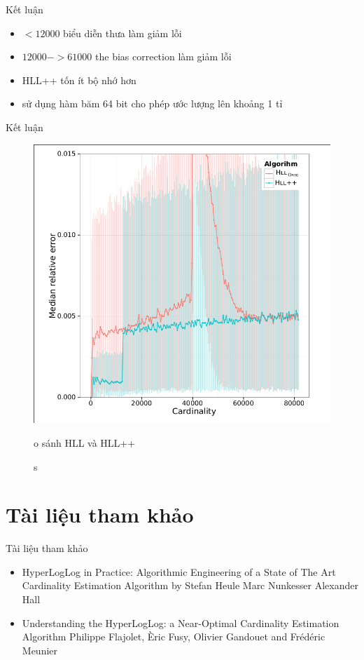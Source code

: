 \documentclass{beamer}
\newcommand{\bi}{\begin{itemize}}
\newcommand{\ei}{\end{itemize}}
\begin{document}
\begin{frame}{Kết luận}
\begin{itemize}
\item $<12000$ biểu diễn thưa làm giảm lỗi
\item $12000->61000$ the bias correction làm giảm lỗi
\item HLL++ tốn ít bộ nhớ hơn
\item sử dụng hàm băm 64 bit cho phép ước lượng lên khoảng 1 tỉ
\end{itemize}

\end{frame}
\begin{frame}{Kết luận }
\begin{figure}[H]
\includegraphics[scale=0.3]{KL.png}
\caption so sánh HLL và HLL++
\end{figure}

\end{frame}
\section*{Tài liệu tham khảo}

\begin{frame}{Tài liệu tham khảo}
    \vspace{20pt}

    \bi
        \item HyperLogLog in Practice: Algorithmic Engineering of a
State of The Art Cardinality Estimation Algorithm by Stefan Heule Marc Nunkesser Alexander Hall
        \item Understanding the HyperLogLog: a
Near-Optimal Cardinality Estimation Algorithm
Philippe Flajolet, Èric Fusy, Olivier Gandouet and Frédéric Meunier
    \ei
\end{frame}
\end{document}
